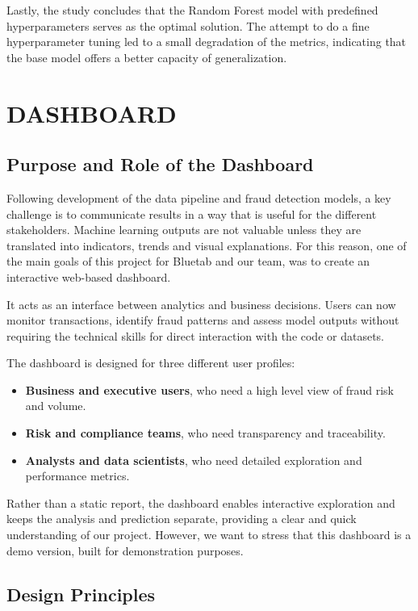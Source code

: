 \documentclass[12pt,a4paper]{report}
\begin{document}
Lastly, the study concludes that the Random Forest model with predefined hyperparameters serves as the optimal solution. The attempt to do a fine hyperparameter tuning led to a small degradation of the metrics, indicating that the base model offers a better capacity of generalization.


\chapter{DASHBOARD}

\section{Purpose and Role of the Dashboard}

Following development of the data pipeline and fraud detection models, a key challenge is to communicate results in a way that is useful for the different stakeholders. Machine learning outputs are not valuable unless they are translated into indicators, trends and visual explanations.  For this reason, one of the main goals of this project for Bluetab and our team, was to create an interactive web-based dashboard.

It acts as an interface between analytics and business decisions. Users can now monitor transactions, identify fraud patterns and assess model outputs without requiring the technical skills for direct interaction with the code or datasets.

The dashboard is designed for three different user profiles: 
\begin{itemize}
    \item\textbf{Business and executive users}, who need a high level view of fraud risk and volume.
    \item \textbf{Risk and compliance teams}, who need transparency and traceability.
    \item \textbf{Analysts and data scientists}, who need detailed exploration and performance metrics. 
\end{itemize}

Rather than a static report, the dashboard enables interactive exploration and keeps the analysis and prediction separate, providing a clear and quick understanding of our project.  However, we want to stress that this dashboard is a demo version, built for demonstration purposes.

\section{Design Principles}
\end{document}
